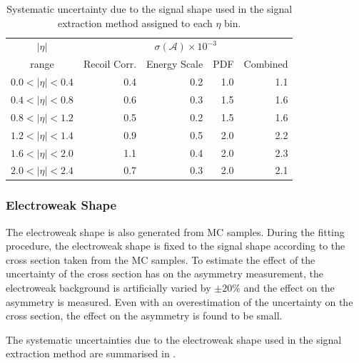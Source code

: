 \begin{table}[htbp]
\begin{center}
\begin{tabular}{crrrr}
    \toprule
$|\eta|$   & \multicolumn{4}{c}{$\sigma(\mathcal{A}) \times 10^{-3}$}\\
range      & Recoil Corr. & Energy Scale & PDF & Combined \\
\midrule
$0.0<|\eta|<0.4$ &  0.4 & 0.2 & 1.0  & 1.1 \\
$0.4<|\eta|<0.8$ &  0.6 & 0.3 & 1.5  & 1.6 \\
$0.8<|\eta|<1.2$ &  0.5 & 0.2 & 1.5  & 1.6 \\
$1.2<|\eta|<1.4$ &  0.9 & 0.5 & 2.0  & 2.2 \\
$1.6<|\eta|<2.0$ &  1.1 & 0.4 & 2.0  & 2.3 \\
$2.0<|\eta|<2.4$ &  0.7 & 0.3 & 2.0  & 2.1 \\
    \bottomrule
\end{tabular}
\caption[Systematic uncertainty due to the signal \ETm shape used in the signal
extraction method.] {\label{tab:systSIG}Systematic uncertainty due to the signal
\ETm shape used in the signal extraction method assigned to each $\eta$
bin\cite{baisini2010electron}.}
\end{center}
\end{table}

\subsubsection{{Electroweak} \ETm Shape}

The {electroweak} shape is also generated from {MC} samples. During the fitting
procedure, the {electroweak} shape is fixed to the \Wenu signal shape according to
the cross section taken from the {MC} samples. To estimate the effect of the
uncertainty of the cross section has on the asymmetry measurement, the {electroweak}
background is artificially varied by $\pm20\%$ and the effect on the
asymmetry is measured. Even with an overestimation of the uncertainty on the
cross section, the effect on the asymmetry is found to be small.

The systematic uncertainties due to the electroweak \ETm shape used in the signal
extraction method are summarised in .

